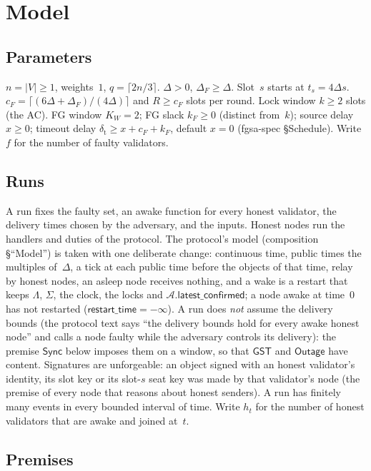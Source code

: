 \documentclass{article}
\newcommand{\AC}{\mathcal A}
\newcommand{\latestConfirmed}{\mathsf{latest\_confirmed}}
\newcommand{\cF}{c_F}
\begin{document}
\section{Model}\label{sec:model}

\subsection{Parameters}

$n=|V|\geq1$, weights~$1$, $q=\lceil 2n/3\rceil$.  $\Delta>0$, $\Delta_F\geq\Delta$.
Slot~$s$ starts at $t_s=4\Delta s$.  $\cF=\lceil(6\Delta+\Delta_F)/(4\Delta)\rceil$
and $R\geq\cF$ slots per round.  Lock window $k\geq2$ slots (the AC).  FG
window $K_W=2$; FG slack $k_F\geq0$ (distinct from~$k$); source delay
$x\geq0$; timeout delay $\delta_{\mathrm t}\geq x+\cF+k_F$, default $x=0$
(fgsa-spec \S Schedule).  Write $f$ for the number of faulty validators.

\subsection{Runs}

A run fixes the faulty set, an awake function for every honest validator, the
delivery times chosen by the adversary, and the inputs.  Honest nodes run the
handlers and duties of the protocol.  The protocol's model
(composition \S``Model'') is taken with one deliberate change: continuous time, public times the
multiples of~$\Delta$, a tick at each public time before the objects of that
time, relay by honest nodes, an asleep node receives nothing, and a wake is
a restart that keeps $\Lambda$, $\Sigma$, the clock, the locks and
$\AC.\latestConfirmed$; a node awake at time~$0$ has not restarted
($\mathsf{restart\_time}=-\infty$).  A run does \emph{not} assume the delivery
bounds (the protocol text says ``the delivery bounds hold for every awake
honest node'' and calls a node faulty while the adversary controls its
delivery): the premise $\mathsf{Sync}$ below imposes them on a window, so that
$\mathsf{GST}$ and $\mathsf{Outage}$ have content.  Signatures are
unforgeable: an object signed with an honest validator's identity, its slot
key or its slot-$s$ seat key was made by that validator's node (the premise of every node that reasons
about honest senders).  A run has finitely many events in every bounded
interval of time.  Write $h_t$ for the number of honest validators that are
awake and joined at~$t$.

\subsection{Premises}
\end{document}
